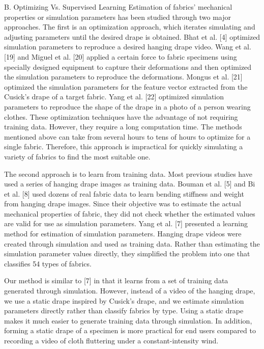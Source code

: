 \documentclass[twocolumn]{article}
\begin{document}
B. Optimizing Vs. Supervised Learning
Estimation of fabrics’ mechanical properties or simulation parameters has been studied through two major approaches. The first is an optimization approach, which iterates simulating and adjusting parameters until the desired drape is obtained. Bhat et al. [4] optimized simulation parameters to reproduce a desired hanging drape video. Wang et al. [19] and Miguel et al. [20] applied a certain force to fabric specimens using specially designed equipment to capture their deformations and then optimized the simulation parameters to reproduce the deformations. Mongus et al. [21] optimized the simulation parameters for the feature vector extracted from the Cusick’s drape of a target fabric. Yang et al. [22] optimized simulation parameters to reproduce the shape of the drape in a photo of a person wearing clothes. These optimization techniques have the advantage of not requiring training data. However, they require a long computation time. The methods mentioned above can take from several hours to tens of hours to optimize for a single fabric. Therefore, this approach is impractical for quickly simulating a variety of fabrics to find the most suitable one.

The second approach is to learn from training data. Most previous studies have used a series of hanging drape images as training data. Bouman et al. [5] and Bi et al. [8] used dozens of real fabric data to learn bending stiffness and weight from hanging drape images. Since their objective was to estimate the actual mechanical properties of fabric, they did not check whether the estimated values are valid for use as simulation parameters. Yang et al. [7] presented a learning method for estimation of simulation parameters. Hanging drape videos were created through simulation and used as training data. Rather than estimating the simulation parameter values directly, they simplified the problem into one that classifies 54 types of fabrics.

Our method is similar to [7] in that it learns from a set of training data generated through simulation. However, instead of a video of the hanging drape, we use a static drape inspired by Cusick’s drape, and we estimate simulation parameters directly rather than classify fabrics by type. Using a static drape makes it much easier to generate training data through simulation. In addition, forming a static drape of a specimen is more practical for end users compared to recording a video of cloth fluttering under a constant-intensity wind.



\end{document}
